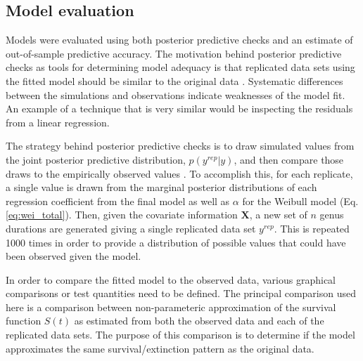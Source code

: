 \documentclass[12pt,letterpaper]{article}
\begin{document}
\subsection{Model evaluation}
Models were evaluated using both posterior predictive checks and an estimate of out-of-sample predictive accuracy. The motivation behind posterior predictive checks as tools for determining model adequacy is that replicated data sets using the fitted model should be similar to the original data \citep{Gelman2013d}. Systematic differences between the simulations and observations indicate weaknesses of the model fit. An example of a technique that is very similar would be inspecting the residuals from a linear regression.

The strategy behind posterior predictive checks is to draw simulated values from the joint posterior predictive distribution, \(p(y^{rep} | y)\), and then compare those draws to the empirically observed values \citep{Gelman2013d}. To accomplish this, for each replicate, a single value is drawn from the marginal posterior distributions of each regression coefficient from the final model as well as \(\alpha\) for the Weibull model (Eq. \ref{eq:wei_total}). Then, given the covariate information \(\mathbf{X}\), a new set of \(n\) genus durations are generated giving a single replicated data set \(y^{rep}\). This is repeated 1000 times in order to provide a distribution of possible values that could have been observed given the model. 

In order to compare the fitted model to the observed data, various graphical comparisons or test quantities need to be defined. The principal comparison used here is a comparison between non-parameteric approximation of the survival function \(S(t)\) as estimated from both the observed data and each of the replicated data sets. The purpose of this comparison is to determine if the model approximates the same survival/extinction pattern as the original data. 
\end{document}
